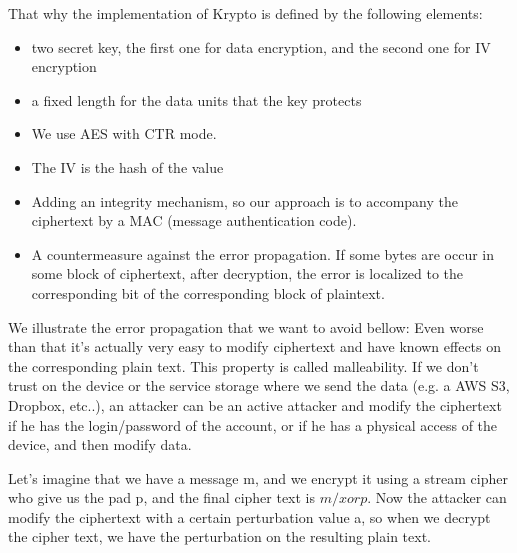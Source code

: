 \documentclass[10pt,a4paper]{report}
\begin{document}
That why the implementation of Krypto is defined by the following elements:
\begin{itemize}
\item two secret key, the first one for data encryption, and the second one for IV encryption
\item a fixed length for the data units that the key protects
\item We use AES with CTR mode.
\item The IV is the hash of the value
\item Adding an integrity mechanism, so our approach is to accompany the ciphertext by a MAC (message authentication code).
\item A countermeasure against the error propagation. If some bytes are occur in some block of ciphertext, after decryption, the error is localized to the corresponding bit of the corresponding block of plaintext. 
\end{itemize}

We illustrate the error propagation that we want to avoid bellow:\newline
Even worse than that it's actually very easy to modify ciphertext and have known effects on the corresponding plain text. This property is called malleability. If we don't trust on the device or the service storage where we send the data (e.g. a AWS S3, Dropbox, etc..), an attacker can be an active attacker and modify the ciphertext if he has the login/password of the account, or if he has a physical access of the device, and then modify data.

\newpage
Let's imagine that we have a message m, and we encrypt it using a stream cipher who give us the pad p, and the final cipher text is $m /xor p$.
Now the attacker can modify the ciphertext with a certain perturbation value a, so when we decrypt the cipher text, we have the perturbation on the resulting plain text.\newline
\end{document}
